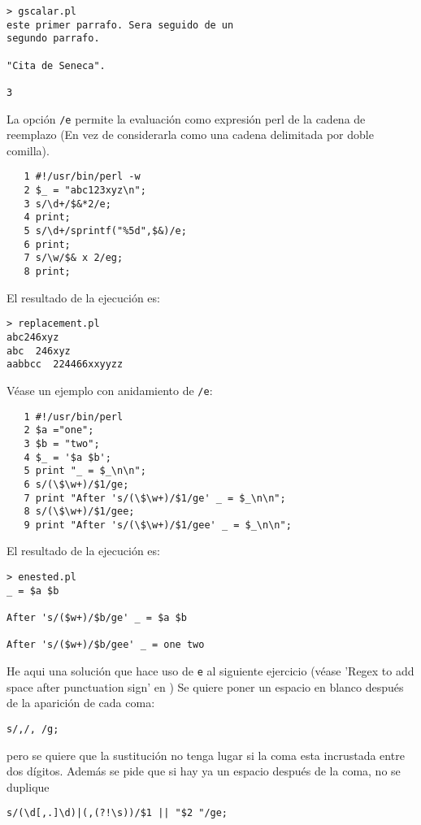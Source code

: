 \begin{verbatim}
> gscalar.pl
este primer parrafo. Sera seguido de un
segundo parrafo.
 
"Cita de Seneca".
 
3 
\end{verbatim}

\label{section:regeval}
La opción \verb|/e| permite la evaluación como expresión perl de la
cadena de reemplazo (En vez de considerarla como una cadena delimitada 
por doble comilla).

\begin{verbatim}
   1 #!/usr/bin/perl -w
   2 $_ = "abc123xyz\n";
   3 s/\d+/$&*2/e;
   4 print;
   5 s/\d+/sprintf("%5d",$&)/e;
   6 print;
   7 s/\w/$& x 2/eg;
   8 print;
\end{verbatim}
El resultado de la ejecución es:
\begin{verbatim}
> replacement.pl
abc246xyz
abc  246xyz
aabbcc  224466xxyyzz 
\end{verbatim}

Véase un ejemplo con anidamiento de {\tt /e}:
\begin{verbatim}
   1 #!/usr/bin/perl 
   2 $a ="one";
   3 $b = "two";
   4 $_ = '$a $b';
   5 print "_ = $_\n\n";
   6 s/(\$\w+)/$1/ge;
   7 print "After 's/(\$\w+)/$1/ge' _ = $_\n\n";
   8 s/(\$\w+)/$1/gee;
   9 print "After 's/(\$\w+)/$1/gee' _ = $_\n\n";
\end{verbatim}
El resultado de la ejecución es:
\begin{verbatim} 
> enested.pl
_ = $a $b
 
After 's/($w+)/$b/ge' _ = $a $b
 
After 's/($w+)/$b/gee' _ = one two  
\end{verbatim}

He aqui una solución que hace uso de \verb|e| al siguiente ejercicio 
(véase 'Regex to add space after punctuation sign' en )
Se quiere poner un espacio en blanco después de la aparición de cada coma:
\begin{verbatim}
s/,/, /g;
\end{verbatim}
pero se quiere que la sustitución no tenga lugar si la coma esta incrustada entre
dos dígitos. Además se pide que si hay ya un espacio después de la coma,
no se duplique

\begin{verbatim}
s/(\d[,.]\d)|(,(?!\s))/$1 || "$2 "/ge; 
\end{verbatim}

